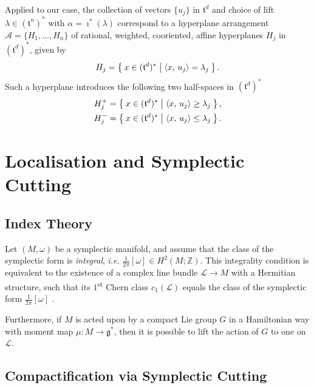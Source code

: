 \documentclass{article}
\newcommand{\ie}{\emph{i.e.} }
\newcommand{\ra}{\rightarrow}
\newcommand{\w}{\omega}
\newcommand{\ZZ}{\mathbb{Z}}
\newcommand{\mcA}{\mathcal{A}}
\newcommand{\mcL}{\mathcal{L}}
\newcommand{\mfg}{\mathfrak{g}}
\newcommand{\mft}{\mathfrak{t}}
\begin{document}
	Applied to our case, the collection of vectors $\{u_{j}\}$ in $\mft^{d}$ and choice of lift $\lambda \in (\mft^{n})^{\ast}$ with $\alpha = \imath^{\ast}(\lambda)$ correspond to a hyperplane arrangement $\mcA = \{H_{1}, \ldots, H_{n}\}$ of rational, weighted, cooriented, affine hyperplanes $H_{j}$ in $(\mft^{d})^{\ast}$, given by
	\[
		H_{j} = \Set{ x \in (\mft^{d})^{\ast} | \langle x,\, u_{j} \rangle = \lambda_{j}}.
	\]
	Such a hyperplane introduces the following two half-spaces in $(\mft^{d})^{\ast}$
	\begin{align*}
		H_{j}^{+} &= \Set{ x \in (\mft^{d})^{\ast} | \langle x,\, u_{j} \rangle \geq \lambda_{j} }, \\
		H_{j}^{-} &= \Set{ x \in (\mft^{d})^{\ast} | \langle x,\, u_{j} \rangle \leq \lambda_{j} }.
	\end{align*}
	
	
	\section{Localisation and Symplectic Cutting}
	
	\subsection{Index Theory}
	
	Let $(M, \w)$ be a symplectic manifold, and assume that the class of the symplectic form is \emph{integral}, \ie $\tfrac{1}{2\pi}[\w] \in H^{2}(M; \ZZ)$. This integrality condition is equivalent to the existence of a complex line bundle $\mcL \ra M$ with a Hermitian structure, such that its $1$\textsuperscript{st} Chern class $c_{1}(\mcL)$ equals the class of the symplectic form $\tfrac{1}{2\pi}[\w]$ \cite{Duistermaat2011}.
	
	Furthermore, if $M$ is acted upon by a compact Lie group $G$ in a Hamiltonian way with moment map $\mu : M \ra \mfg^{\ast}$, then it is possible to lift the action of $G$ to one on $\mcL$. 

	\subsection{Compactification via Symplectic Cutting}
	
	
\end{document}
